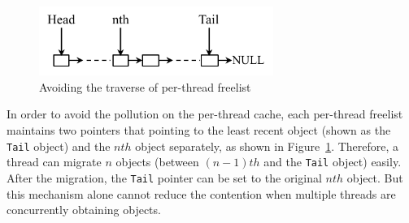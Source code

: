 \begin{figure}
\centering
\includegraphics[width=3in]{figure/perthreadlist}
\vspace{-0.1in}
\caption{Avoiding the traverse of per-thread freelist\label{fig:perthreadlist}}
\vspace{-0.1in}
\end{figure}
In order to avoid the pollution on the per-thread cache, each per-thread freelist maintains two pointers that pointing to the least recent object (shown as the \texttt{Tail} object) and the $nth$ object separately, as shown in Figure~\ref{fig:perthreadlist}. Therefore, a thread can migrate $n$ objects (between $(n-1)th$ and the \texttt{Tail} object) easily. 
After the migration,  the \texttt{Tail} pointer can be set to the original $nth$ object. But this mechanism alone cannot reduce the contention when multiple threads are concurrently obtaining objects.

